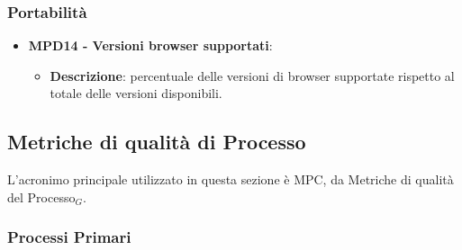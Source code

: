 \documentclass[10pt]{article}
\begin{document}
\begin{justify}
\subsubsection{Portabilità}
  \begin{itemize}
    \item \textbf{MPD14 - Versioni browser supportati}:
      \begin{itemize}
        \item \textbf{Descrizione}: percentuale delle versioni di browser supportate rispetto al totale delle versioni disponibili.
      \end{itemize}
\end{itemize}

\subsection{Metriche di qualità di Processo}
L'acronimo principale utilizzato in questa sezione è MPC, da Metriche di qualità del Processo$_G$.

\subsubsection{Processi Primari}

\end{justify}
\end{document}
